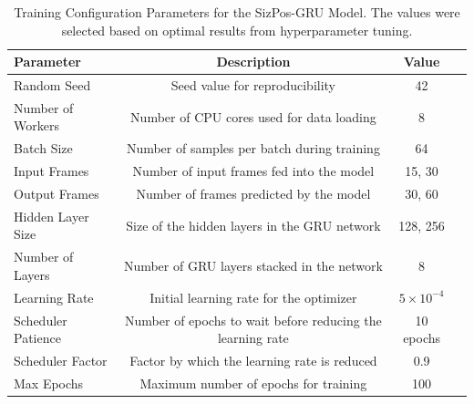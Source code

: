 \documentclass[12pt,oneside]{book} %
\begin{document}
\begin{table}[H]
    \centering
    \caption{Training Configuration Parameters for the SizPos-GRU Model. The values were selected based on optimal results from hyperparameter tuning.}
    \label{tab:training_parameters}
    \begin{adjustbox}{max width=\textwidth}
        \begin{tabular}{lccc}
            \toprule
            \textbf{Parameter} & \textbf{Description}                                       & \textbf{Value}                            \\ 
            \midrule
            Random Seed        & Seed value for reproducibility                             & 42                                        \\ 
            Number of Workers  & Number of CPU cores used for data loading                  & 8                                         \\ 
            Batch Size         & Number of samples per batch during training                & 64                                        \\ 
            Input Frames       & Number of input frames fed into the model                  & 15, 30                                    \\ 
            Output Frames      & Number of frames predicted by the model                    & 30, 60                                    \\ 
            Hidden Layer Size  & Size of the hidden layers in the GRU network               & 128, 256                                  \\ 
            Number of Layers   & Number of GRU layers stacked in the network                & 8                                         \\ 
            Learning Rate      & Initial learning rate for the optimizer                    & $5 \times 10^{-4}$                        \\ 
            Scheduler Patience & Number of epochs to wait before reducing the learning rate & 10 epochs                                 \\ 
            Scheduler Factor   & Factor by which the learning rate is reduced               & 0.9                                       \\ 
            Max Epochs         & Maximum number of epochs for training                      & 100                                       \\ 

\end{tabular}
\end{adjustbox}
\end{table}
\end{document}
